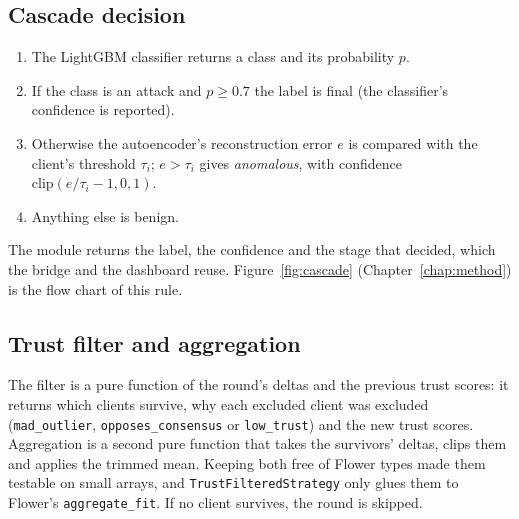 \subsection{Cascade decision}
\begin{enumerate}
  \item The LightGBM classifier returns a class and its probability $p$.
  \item If the class is an attack and $p\ge0.7$ the label is final (the classifier's confidence is reported).
  \item Otherwise the autoencoder's reconstruction error $e$ is compared with the client's threshold $\tau_i$; $e>\tau_i$ gives \emph{anomalous}, with confidence $\mathrm{clip}(e/\tau_i-1,0,1)$.
  \item Anything else is benign.
\end{enumerate}
The module returns the label, the confidence and the stage that decided, which the bridge and the dashboard reuse. Figure~\ref{fig:cascade} (Chapter~\ref{chap:method}) is the flow chart of this rule.

\subsection{Trust filter and aggregation}
The filter is a pure function of the round's deltas and the previous trust scores: it returns which clients survive, why each excluded client was excluded (\texttt{mad\_outlier}, \texttt{opposes\_consensus} or \texttt{low\_trust}) and the new trust scores. Aggregation is a second pure function that takes the survivors' deltas, clips them and applies the trimmed mean. Keeping both free of Flower types made them testable on small arrays, and \texttt{TrustFilteredStrategy} only glues them to Flower's \texttt{aggregate\_fit}. If no client survives, the round is skipped.

